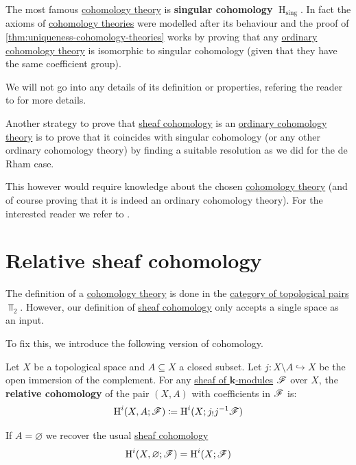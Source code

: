 \documentclass[../../main]{subfiles}
\begin{document}
The most famous \hyperref[def:cohomology-theory]{cohomology theory} is \textbf{singular cohomology} \(\operatorname{H}_{\operatorname{sing}}\).
In fact the axioms of \hyperref[def:cohomology-theory]{cohomology theories} were modelled after its behaviour and the proof of \autoref{thm:uniqueness-cohomology-theories} works by proving that any \hyperref[def:cohomology-theory]{ordinary cohomology theory} is isomorphic to singular cohomology (given that they have the same coefficient group).

We will not go into any details of its definition or properties, refering the reader to \cite[Chapter 3]{hatcherAlgebraicTopology2002} for more details.

\begin{remark}
  Another strategy to prove that \hyperref[def:sheaf-cohomology]{sheaf cohomology} is an \hyperref[def:cohomology-theory]{ordinary cohomology theory} is to prove that it coincides with singular cohomology (or any other ordinary cohomology theory) by finding a suitable resolution as we did for the de Rham case.

  This however would require knowledge about the chosen \hyperref[def:cohomology-theory]{cohomology theory} (and of course proving that it is indeed an ordinary cohomology theory).
  For the interested reader we refer to \cite[Chapter III]{bredonSheafTheory1997}.
\end{remark}


\section{Relative sheaf cohomology}

The definition of a \hyperref[def:cohomology-theory]{cohomology theory} is done in the \hyperref[def:topological-pair]{category of topological pairs} \(\Top_{2}\).
However, our definition of \hyperref[def:sheaf-cohomology]{sheaf cohomology} only accepts a single space as an input.

To fix this, we introduce the following version of cohomology.

\begin{definition}\label{def:relative-sheaf-cohomology}
  Let \(X\) be a topological space and \(A \subseteq X\) a closed subset.
  Let \(j\colon X \setminus A \hookrightarrow X\) be the open immersion of the complement.
  For any \hyperref[def:sheaf]{sheaf of \(\mathbf{k}\)-modules} \(\mathscr{F}\) over \(X\), the \textbf{relative cohomology} of the pair \((X, A)\) with coefficients in \(\mathscr{F}\) is:
  \begin{equation*}
    \operatorname{H}^{i}(X, A; \mathscr{F}) \coloneq \operatorname{H}^{i}(X; j_{!}j^{-1}\mathscr{F})
  \end{equation*}

  If \(A = \varnothing\) we recover the usual \hyperref[def:sheaf-cohomology]{sheaf cohomology}
  \begin{equation*}
    \operatorname{H}^{i}(X, \varnothing; \mathscr{F}) = \operatorname{H}^{i}(X; \mathscr{F})
  \end{equation*}
\end{definition}
\end{document}
